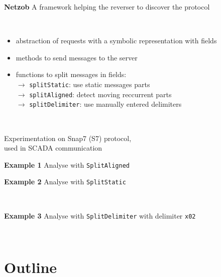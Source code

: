\documentclass{beamer}
\newcounter{m} %
\newcounter{c} %
\begin{document}
\begin{frame}{\bf \textbf{Netzob}}
  A framework helping the reverser to discover the protocol
 
  ~

  \begin{itemize}
    \item abstraction of requests with a symbolic representation with fields
    \item methods to send messages to the server
    \item functions to split messages in fields:\\
    \quad\quad$\rightarrow$ \texttt{splitStatic}: use static messages parts\\
    \quad\quad$\rightarrow$ \texttt{splitAligned}: detect moving reccurrent parts\\
    \quad\quad$\rightarrow$ \texttt{splitDelimiter}: use manually entered delimiters
  \end{itemize}

  ~

  Experimentation on Snap7 (S7) protocol, \\used in SCADA communication

\end{frame}


\begin{frame}{\bf Example 1}
  Analyse with \texttt{SplitAligned}
  ~

  \tiny
\end{frame}

\begin{frame}{\bf Example 2}
  Analyse with \texttt{SplitStatic}

  ~

  \tiny
\end{frame}

\begin{frame}{\bf Example 3}
  Analyse with \texttt{SplitDelimiter} with delimiter \texttt{x02}

  ~

  \tiny
\end{frame}

\section{Outline}
\end{document}

